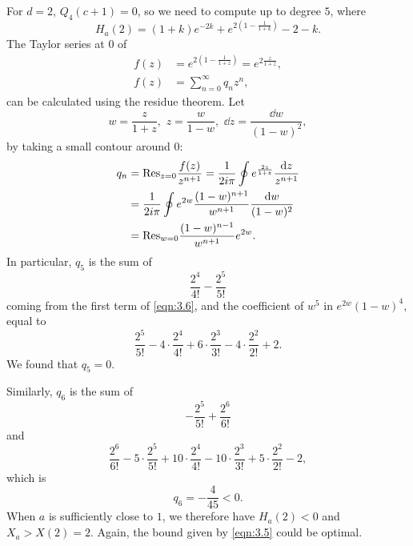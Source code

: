 For $d = 2$, $Q_4(c+1) = 0$, so we need to compute up to degree $5$, where
\begin{equation}
    \label{eqn:3.6}
    H_a(2) = (1+k)e^{-2k} + e^{2(1 - \frac{1}{1+k})} - 2 - k.
\end{equation}
The Taylor series at $0$ of
\begin{align*}
    f(z) &= e^{2(1 - \frac{1}{1+z})} = e^{2\frac{z}{1+z}},\\
    f(z) &= \sum_{n=0}^{\infty} q_n z^n,
\end{align*}
can be calculated using the residue theorem.
Let
\[
    w = \frac{z}{1+z}, \,\,z = \frac{w}{1-w}, \,\,\dd z = \frac{\dd w}{(1-w)^2},
\]
by taking a small contour around $0$:
\begin{align*}
    q_n &= \mathrm{Res}_{z=0} \frac{f(z)}{z^{n+1}} = \frac{1}{2 i \pi} \oint e^{\frac{2z}{1+z}} \frac{\mathrm{d} z}{z^{n+1}} \\
    &= \frac{1}{2 i \pi} \oint e^{2w} \frac{(1-w)^{n+1}}{w^{n+1}} \frac{\mathrm{d} w}{(1-w)^{2}} \\
    &= \mathrm{Res}_{w=0} \frac{(1-w)^{n-1}}{w^{n+1}} e^{2w}.
\end{align*}
In particular, $q_5$ is the sum of
\begin{equation}
    \label{eqn:3.7}
    \frac{2^4}{4!} - \frac{2^5}{5!}
\end{equation}
coming from the first term of \eqref{eqn:3.6}, and the coefficient of $w^5$ in $e^{2w}(1-w)^{4}$, equal to
\begin{equation}
    \label{eqn:3.8}
    \frac{2^5}{5!} - 4 \cdot \frac{2^4}{4!} +  6 \cdot \frac{2^3}{3!} - 4 \cdot \frac{2^2}{2!} + 2.
\end{equation}
We found that $q_5 = 0$.

Similarly, $q_6$ is the sum of
\begin{equation}
    \label{eqn:3.9}
    -\frac{2^5}{5!} + \frac{2^6}{6!}
\end{equation}
and
\begin{equation}
    \label{eqn:3.10}
    \frac{2^6}{6!} - 5 \cdot \frac{2^5}{5!} + 10 \cdot \frac{2^4}{4!} - 10 \cdot \frac{2^3}{3!} + 5 \cdot \frac{2^2}{2!} - 2,
\end{equation}
which is
\[
    q_6 = -\frac{4}{45} < 0.
\]
When $a$ is sufficiently close to $1$, we therefore have $H_a(2) < 0$ and $X_a > X(2) = 2$.
Again, the bound given by \eqref{eqn:3.5} could be optimal.

